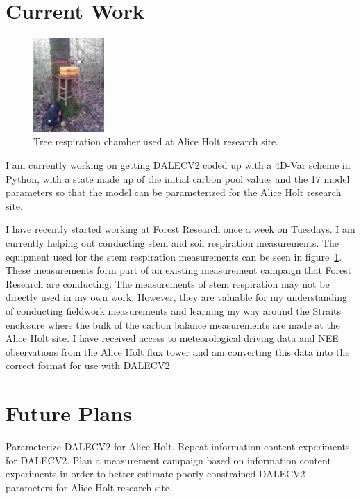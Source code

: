 \documentclass[11pt]{article}
\begin{document}
\section{Current Work}
\begin{figure}
    \includegraphics[width=0.24\textwidth]{treechamber.png}
  \caption{Tree respiration chamber used at Alice Holt research site.}
\label{stem}
\end{figure}
I am currently working on getting DALECV2 coded up with a 4D-Var scheme in Python, with a state made up of the initial carbon pool values and the 17 model parameters so that the model can be parameterized for the Alice Holt research site.

I have recently started working at Forest Research once a week on Tuesdays. I am currently helping out conducting stem and soil respiration measurements. The equipment used for the stem respiration measurements can be seen in figure~\ref{stem}. These measurements form part of an existing measurement campaign that Forest Research are conducting. The measurements of stem respiration may not be directly used in my own work. However, they are valuable for my understanding of conducting fieldwork measurements and learning my way around the Straits enclosure where the bulk of the carbon balance measurements are made at the Alice Holt site. I have received access to meteorological driving data and NEE observations from the Alice Holt flux tower and am converting this data into the correct format for use with DALECV2 





\section{Future Plans}

Parameterize DALECV2 for Alice Holt. Repeat information content experiments for DALECV2. Plan a measurement campaign based on information content experiments in order to better estimate poorly constrained DALECV2 parameters for Alice Holt research site.  
\end{document}
